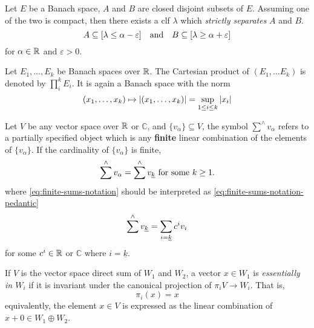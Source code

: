 \documentclass[../main-manifolds.tex]{subfiles}
\begin{document}
\begin{wts}\label{prop:hahn-banach-geometric-form}
    Let $E$ be a Banach space, $A$ and $B$ are closed disjoint subsets of $E$. Assuming one of the two is compact, then there exists a clf $\lambda$ which \emph{strictly separates} $A$ and $B$. 
    \begin{equation}\label{eq:hahn-banach-geometric-form}
        A\subseteq [\lambda \leq \alpha-\varepsilon]\qqtext{and} B\subseteq [\lambda\geq\alpha + \varepsilon]
    \end{equation}
    for $\alpha\in\mathbb{R}$ and $\varepsilon>0$.
\end{wts}


\begin{definition}\label{def:finite-product-banach-space}
    Let $E_1,\ldots, E_k$ be Banach spaces over $\mathbb{R}$. The Cartesian product of $(E_1,\ldots E_k)$ is denoted by $\prod_i^k E_i$. It is again a Banach space with the norm
    \begin{equation}\label{eq:finite-product-banach-space-norm}
        (x_1,\ldots, x_k)\mapsto \abs{(x_1,\ldots, x_k)} = \sup_{1 \leq i\leq k}\abs{x_i}
    \end{equation}
\end{definition}

Let $V$ be any vector space over $\mathbb{R}$ or $\mathbb{C}$, and $\{v_{\alpha}\}\subseteq V$, the symbol $\sum^{\wedge}v_\alpha$ refers to a partially specified object which is any \textbf{finite} linear combination of the elements of $\{v_{\alpha}\}$. If the cardinality of $\{v_{\alpha}\}$ is finite, 
\begin{equation}\label{eq:finite-sums-notation}
\sum^\wedge v_{\alpha} = \sum^\wedge\UL{v}[k]\text{ for some $k\geq 1$.}        
\end{equation}
where \cref{eq:finite-sums-notation} should be interpreted as \cref{eq:finite-sums-notation-pedantic}
\begin{equation}\label{eq:finite-sums-notation-pedantic}
    \sum^\wedge\UL{v}[k] = \sum_{i=\underline{k}}c^iv_i
\end{equation}
for some $c^i\in\mathbb{R}$ or $\mathbb{C}$ where $i=\underline{k}$. \\

\begin{definition}[$x$ is essentially in $W_1$]
If $V$ is the vector space direct sum of $W_1$ and $W_2$, a vector $x\in W_1$ is \emph{essentially in $W_i$} if it is invariant under the canonical projection of $\pi_i V\to W_i$. That is,
\[
    \pi_i (x) = x
\]
equivalently, the element $x\in V$ is expressed as the linear combination of $x + 0\in W_1\oplus W_2$.
\end{definition}
\end{document}
